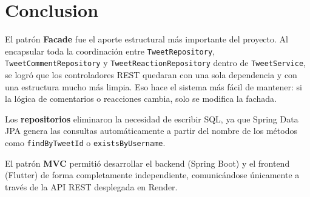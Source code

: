 \documentclass[12pt,a4paper]{article}
\begin{document}
\section{Conclusion}

El patrón \textbf{Facade} fue el aporte estructural más importante del
proyecto. Al encapsular toda la coordinación entre \texttt{TweetRepository},
\texttt{TweetCommentRepository} y \texttt{TweetReactionRepository} dentro de
\texttt{TweetService}, se logró que los controladores REST quedaran con
una sola dependencia y con una estructura mucho más limpia. Eso hace
el sistema más fácil de mantener: si la lógica de comentarios o reacciones
cambia, solo se modifica la fachada.

Los \textbf{repositorios} eliminaron la necesidad de escribir SQL, ya que
Spring Data JPA genera las consultas automáticamente a partir del nombre
de los métodos como \texttt{findByTweetId} o \texttt{existsByUsername}.

El patrón \textbf{MVC} permitió desarrollar el backend (Spring Boot) y
el frontend (Flutter) de forma completamente independiente, comunicándose
únicamente a través de la API REST desplegada en Render.
\end{document}
